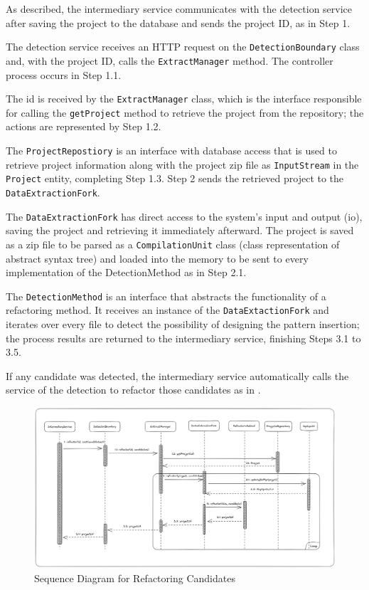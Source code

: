 As described, the intermediary service communicates with the detection service after saving the project to the database and sends the project ID, as in Step 1.

The detection service receives an HTTP request on the \texttt{DetectionBoundary} class and, with the project ID, calls the \texttt{ExtractManager} method. The controller process occurs in Step 1.1.

The id is received by the \texttt{ExtractManager} class, which is the interface responsible for calling the \texttt{getProject} method to retrieve the project from the repository; the actions are represented by Step 1.2.

The \texttt{ProjectRepostiory} is an interface with database access that is used to retrieve project information along with the project zip file as \texttt{InputStream} in the \texttt{Project} entity, completing Step 1.3. Step 2 sends the retrieved project to the \texttt{DataExtractionFork}.

The \texttt{DataExtractionFork} has direct access to the system's input and output (io), saving the project and retrieving it immediately afterward. The project is saved as a zip file to be parsed as a \texttt{CompilationUnit} class (class representation of abstract syntax tree) and loaded into the memory to be sent to every implementation of the DetectionMethod as in Step 2.1.

The \texttt{DetectionMethod} is an interface that abstracts the functionality of a refactoring method. It receives an instance of the \texttt{DataExtactionFork} and iterates over every file to detect the possibility of designing the pattern insertion; the process results are returned to the intermediary service, finishing Steps 3.1 to 3.5.

If any candidate was detected, the intermediary service automatically calls the service of the detection to refactor those candidates as in .

\begin{figure}[ht!]
\SetCaptionWidth{\textwidth}
\caption{Sequence Diagram for Refactoring Candidates}
\label{fig-refactoring}
\includegraphics[width=160mm]{Chapter-2/Figures/refactoring.png}
\end{figure}
\FloatBarrier

